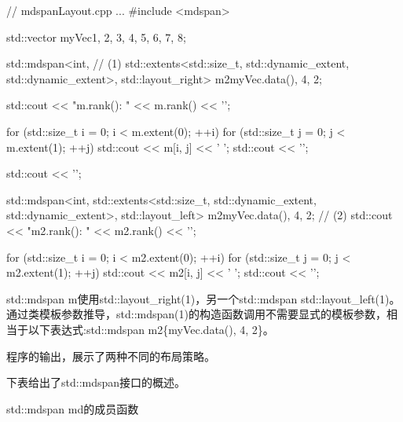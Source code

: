 \begin{cpp}
// mdspanLayout.cpp
...
#include <mdspan>

std::vector myVec{1, 2, 3, 4, 5, 6, 7, 8};

std::mdspan<int, // (1)
	std::extents<std::size_t, std::dynamic_extent, std::dynamic_extent>,
	std::layout_right> m2{myVec.data(), 4, 2};

std::cout << "m.rank(): " << m.rank() << '\n';

for (std::size_t i = 0; i < m.extent(0); ++i) {
	for (std::size_t j = 0; j < m.extent(1); ++j) {
		std::cout << m[i, j] << ' ';
	}
	std::cout << '\n';
}

std::cout << '\n';

std::mdspan<int,
	std::extents<std::size_t, std::dynamic_extent, std::dynamic_extent>,
	std::layout_left> m2{myVec.data(), 4, 2}; // (2)
std::cout << "m2.rank(): " << m2.rank() << '\n';

for (std::size_t i = 0; i < m2.extent(0); ++i) {
	for (std::size_t j = 0; j < m2.extent(1); ++j) {
		std::cout << m2[i, j] << ' ';
	}
	std::cout << '\n';
}
\end{cpp}

std::mdspan m使用std::layout\_right(1)，另一个std::mdspan std::layout\_left(1)。通过类模板参数推导，std::mdspan(1)的构造函数调用不需要显式的模板参数，相当于以下表达式:std::mdspan m2\{myVec.data(), 4, 2\}。

程序的输出，展示了两种不同的布局策略。


下表给出了std::mdspan接口的概述。

\begin{center}
std::mdspan md的成员函数
\end{center}

